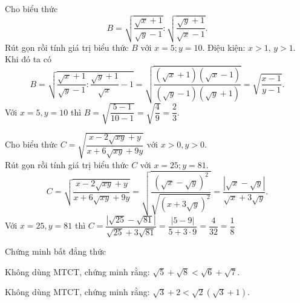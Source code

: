 \begin{vd}%
	Cho biểu thức \[{B}=\sqrt{\dfrac{\sqrt{ {x}} + 1}{\sqrt{ {y}} - 1}}:\sqrt{\dfrac{\sqrt{ {y}} + 1}{\sqrt{ {x}} - 1}}.\] Rút gọn rồi tính giá trị biểu thức $B$ với $x = 5 ; y = 10$.
	\loigiai
	{
	Điệu kiện: $x>1$, $y>1$. Khi đó ta có
	\[B =\sqrt{\dfrac{\sqrt{x} + 1}{\sqrt{y} - 1}:\dfrac{\sqrt{y} + 1}{\sqrt{x}} - 1}=\sqrt{\dfrac{(\sqrt{x} + 1)(\sqrt{x} - 1)}{(\sqrt{y} - 1)(\sqrt{y} + 1)}}=\sqrt{\dfrac{x - 1}{y - 1}}.\]
	Với $x=5,y=10$ thì $B =\sqrt{\dfrac{5 - 1}{10 - 1}}=\sqrt{\dfrac{4}{9}}=\dfrac{2}{3}$.
	}
\end{vd}
\begin{vd}%
	Cho biểu thức $C =\sqrt{\dfrac{x - 2\sqrt{x y} + y}{x + 6\sqrt{x y} + 9y}}\text{ với }x > 0 , y > 0$.\\
	Rút gọn rồi tính giá trị biểu thức $C$ với $x = 25 ; y = 81$.
	\loigiai
	{
	\[C =\sqrt{\dfrac{x - 2\sqrt{x y} + y}{x + 6\sqrt{x y} + 9y}}=\sqrt{\dfrac{(\sqrt{x} - \sqrt{y})^2}{\sqrt{(x + 3\sqrt{y})^2}}}=\dfrac{|\sqrt{x} - \sqrt{y}|}{\sqrt{x} + 3\sqrt{y}}.\]
	Với $x=25, y=81$ thì 
	$C =\dfrac{\left|\sqrt{25} - \sqrt{81}\right|}{\sqrt{25} + 3\sqrt{81}}=\dfrac{| 5 - 9 |}{5 + 3\cdot 9}=\dfrac{4}{32}=\dfrac{1}{8}$
	}
\end{vd}
\begin{dang}{Chứng minh bất đẳng thức}
\end{dang}
\begin{vd}%
	Không dùng MTCT, chứng minh rằng: $\sqrt{5}+\sqrt{8} < \sqrt{6}+\sqrt{7}$. 
\end{vd}
\begin{vd}%
	Không dùng MTCT, chứng minh rằng: $\sqrt{3}+2 < \sqrt{2}\left(\sqrt{3}+1\right)$. 
\end{vd}
